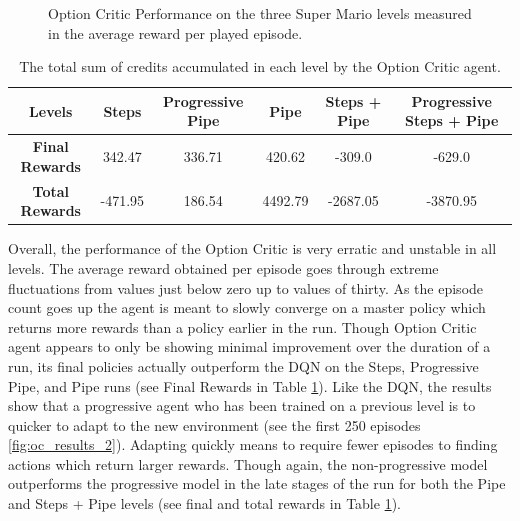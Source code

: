\documentclass[notitlepage,a4paper,11pt]{article}
\begin{document}
\begin{figure}[t]
\begin{subfigure}[t]{0.32\textwidth}
         \caption{}
         \label{fig:oc_results_3}
     \end{subfigure}
        \caption{Option Critic Performance on the three Super Mario levels measured in the average reward per played episode.}
        \label{fig:oc_results}
\end{figure}

\begin{table}[h!]
\centering
\begin{tabular}{ |c|c|c|c|c|c| } 
	\hline
	\textbf{Levels} & Steps & Progressive Pipe  & Pipe & Steps + Pipe & Progressive Steps + Pipe \\
	\hline
	\textbf{Final Rewards} & 342.47 & 336.71 & 420.62 & -309.0 & -629.0\\
	\hline
	\textbf{Total Rewards} & -471.95 & 186.54 & 4492.79 &  -2687.05 & -3870.95 \\
	\hline
\end{tabular}
\caption{The total sum of credits accumulated in each level by the Option Critic agent.}
\label{tbl:oc_rewards}
\end{table}

Overall, the performance of the Option Critic is very erratic and unstable in all levels. The average reward obtained per episode goes through extreme fluctuations from values just below zero up to values of thirty. As the episode count goes up the agent is meant to slowly converge on a master policy which returns more rewards than a policy earlier in the run. Though Option Critic agent appears to only be showing minimal improvement over the duration of a run, its final policies actually outperform the DQN on the Steps, Progressive Pipe, and Pipe runs (see Final Rewards in Table \ref{tbl:oc_rewards}). Like the DQN, the results show that a progressive agent who has been trained on a previous level is to quicker to adapt to the new environment (see the first 250 episodes \ref{fig:oc_results_2}). Adapting quickly means to require fewer episodes to finding actions which return larger rewards. Though again, the non-progressive model outperforms the progressive model in the late stages of the run for both the Pipe and Steps + Pipe levels (see final and total rewards in Table \ref{tbl:oc_rewards}).


\end{document}
